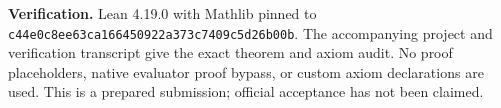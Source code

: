 \documentclass[11pt]{article}
\begin{document}
\textbf{Verification.} Lean 4.19.0 with Mathlib pinned to
\texttt{c44e0c8ee63ca166450922a373c7409c5d26b00b}.
The accompanying project and verification transcript give the exact theorem and axiom audit. No proof placeholders, native evaluator proof bypass, or custom axiom declarations are used. This is a prepared submission; official acceptance has not been claimed.
\end{document}
